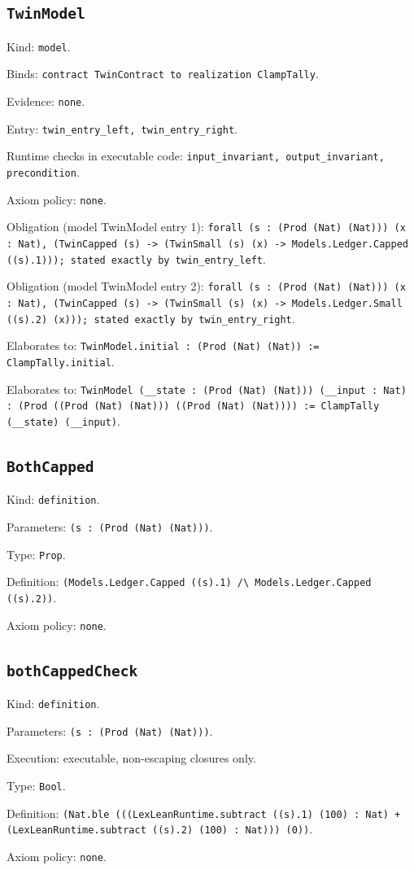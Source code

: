 \documentclass[11pt]{article}
\begin{document}
\subsection*{\texttt{TwinModel}}
\noindent Kind: \texttt{model}.\par
\noindent Binds: \texttt{contract TwinContract to realization ClampTally}.\par
\noindent Evidence: \texttt{none}.\par
\noindent Entry: \texttt{twin\_entry\_left, twin\_entry\_right}.\par
\noindent Runtime checks in executable code: \texttt{input\_invariant, output\_invariant, precondition}.\par
\noindent Axiom policy: \texttt{none}.\par
\noindent Obligation (model TwinModel entry 1): \texttt{forall (s : (Prod (Nat) (Nat))) (x : Nat), (TwinCapped (s) -> (TwinSmall (s) (x) -> Models.Ledger.Capped ((s).1))); stated exactly by twin\_entry\_left}.\par
\noindent Obligation (model TwinModel entry 2): \texttt{forall (s : (Prod (Nat) (Nat))) (x : Nat), (TwinCapped (s) -> (TwinSmall (s) (x) -> Models.Ledger.Small ((s).2) (x))); stated exactly by twin\_entry\_right}.\par
\noindent Elaborates to: \texttt{TwinModel.initial : (Prod (Nat) (Nat)) := ClampTally.initial}.\par
\noindent Elaborates to: \texttt{TwinModel (\_\_state : (Prod (Nat) (Nat))) (\_\_input : Nat) : (Prod ((Prod (Nat) (Nat))) ((Prod (Nat) (Nat)))) := ClampTally (\_\_state) (\_\_input)}.\par
\subsection*{\texttt{BothCapped}}
\noindent Kind: \texttt{definition}.\par
\noindent Parameters: \texttt{(s : (Prod (Nat) (Nat)))}.\par
\noindent Type: \texttt{Prop}.\par
\noindent Definition: \texttt{(Models.Ledger.Capped ((s).1) /\textbackslash{} Models.Ledger.Capped ((s).2))}.\par
\noindent Axiom policy: \texttt{none}.\par
\subsection*{\texttt{bothCappedCheck}}
\noindent Kind: \texttt{definition}.\par
\noindent Parameters: \texttt{(s : (Prod (Nat) (Nat)))}.\par
\noindent Execution: executable, non-escaping closures only.\par
\noindent Type: \texttt{Bool}.\par
\noindent Definition: \texttt{(Nat.ble (((LexLeanRuntime.subtract ((s).1) (100) : Nat) + (LexLeanRuntime.subtract ((s).2) (100) : Nat))) (0))}.\par
\noindent Axiom policy: \texttt{none}.\par
\end{document}
